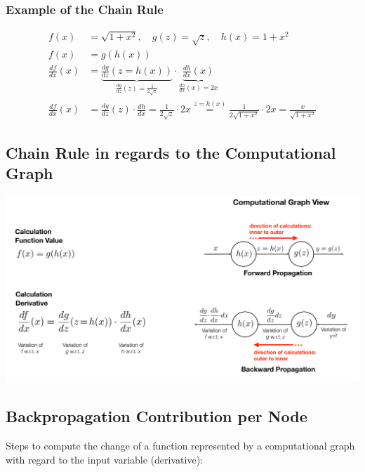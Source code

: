 \documentclass[11pt]{article}
\begin{document}
\subsubsection{Example of the Chain Rule}
\begin{align*}
	f(x) &= \sqrt{1+x^2},\quad g(z) = \sqrt{z},\quad h(x) = 1+x^2\\
	f(x) &= g(h(x))\\
	\frac{df}{dx}(x) &= \underbrace{\frac{dg}{dz} (z=h(x))}_{\frac{dg}{dz}(z) = \frac{1}{2\sqrt{z}}} \cdot \underbrace{\frac{dh}{dx}(x)}_{\frac{dh}{dx}(x) = 2x}\\
	\frac{df}{dx}(x) &= \frac{dg}{dz}(z)\cdot \frac{dh}{dx} = \frac{1}{2\sqrt{z}} \cdot 2x \overset{z=h(x)}{=} \frac{1}{2\sqrt{1+x^2}} \cdot 2x = \frac{x}{\sqrt{1+x^2}}
\end{align*}

\subsection{Chain Rule in regards to the Computational Graph}
\includegraphics[width=0.8\linewidth]{chain_rule_computational_graph}

\subsection{Backpropagation Contribution per Node}
Steps to compute the change of a function represented by a computational graph with regard to the input variable (derivative):
\end{document}
